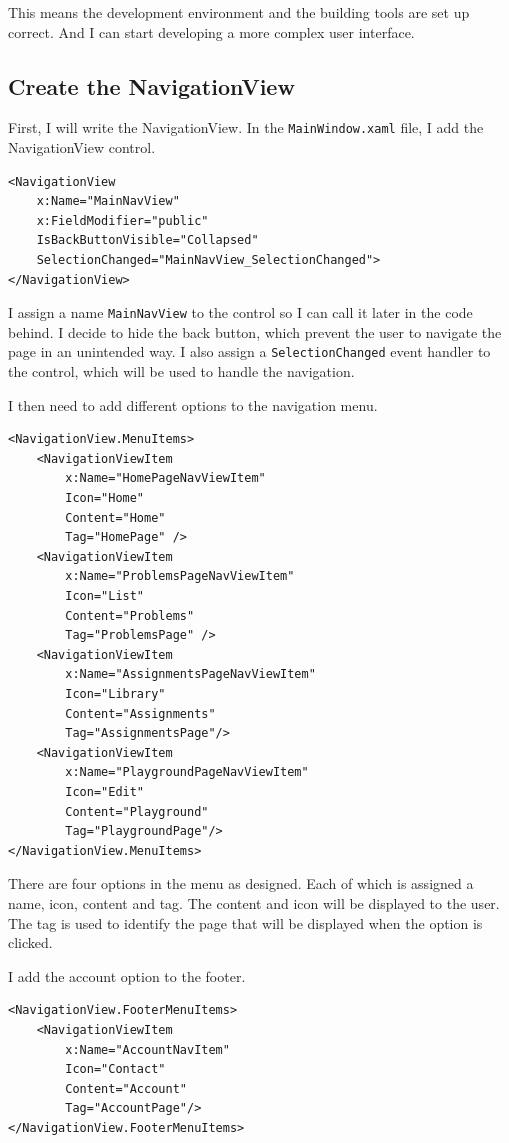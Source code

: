 \documentclass[a4paper]{report}
\begin{document}
This means the development environment and the building tools are 
set up correct. And I can start developing a more complex user interface.

\subsection{Create the NavigationView}

First, I will write the NavigationView. In the \texttt{MainWindow.xaml} file, I add the NavigationView control.

\begin{verbatim}
<NavigationView 
    x:Name="MainNavView"
    x:FieldModifier="public"
    IsBackButtonVisible="Collapsed"
    SelectionChanged="MainNavView_SelectionChanged">
</NavigationView>
\end{verbatim}

I assign a name \texttt{MainNavView} to the control so I can call it later in the code behind. I decide to hide the back button, which prevent the user to navigate the page in an unintended way. I also assign a \texttt{SelectionChanged} event handler to the control, which will be used to handle the navigation.

I then need to add different options to the navigation menu.

\begin{verbatim}
<NavigationView.MenuItems>
    <NavigationViewItem 
        x:Name="HomePageNavViewItem"
        Icon="Home"
        Content="Home"
        Tag="HomePage" />
    <NavigationViewItem
        x:Name="ProblemsPageNavViewItem"
        Icon="List"
        Content="Problems"
        Tag="ProblemsPage" />
    <NavigationViewItem
        x:Name="AssignmentsPageNavViewItem"
        Icon="Library"
        Content="Assignments"
        Tag="AssignmentsPage"/>
    <NavigationViewItem
        x:Name="PlaygroundPageNavViewItem"
        Icon="Edit"
        Content="Playground"
        Tag="PlaygroundPage"/>
</NavigationView.MenuItems>
\end{verbatim}

There are four options in the menu as designed. Each of which is assigned a name, icon, content and tag. The content and icon will be displayed to the user. The tag is used to identify the page that will be displayed when the option is clicked.

I add the account option to the footer.

\begin{verbatim}
<NavigationView.FooterMenuItems>
    <NavigationViewItem
        x:Name="AccountNavItem"
        Icon="Contact"
        Content="Account"
        Tag="AccountPage"/>
</NavigationView.FooterMenuItems>
\end{verbatim}
\end{document}
